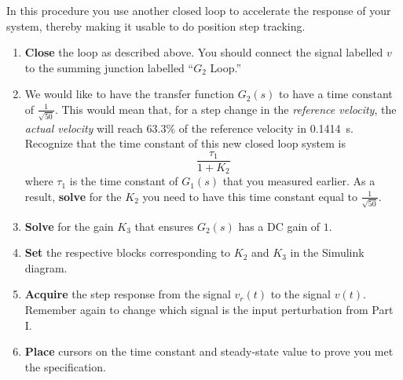 \begin{procedure}[label={proc:lab3:speedup}]
  In this procedure you use another closed loop to accelerate the response of your system, thereby making it usable to do position step tracking.
  \begin{enumerate}[label={(\arabic*)}]
    \item{%
      \textbf{Close} the loop as described above.
      You should connect the signal labelled \(v\) to the summing junction labelled ``\(G_2\) Loop.''%
    }
    \item{%
      We would like to have the transfer function \(G_2(s)\) to have a time constant of \(\frac{1}{\sqrt{50}}.\)
      This would mean that, for a step change in the \emph{reference velocity}, the \emph{actual velocity} will reach \(63.3\%\) of the reference velocity in \SI{0.1414}{s}.
      Recognize that the time constant of this new closed loop system is
      \[
        \frac{\tau_1}{1 + K_2}
      \]
      where \(\tau_1\) is the time constant of \(G_1(s)\) that you measured earlier.
      As a result, \textbf{solve} for the \(K_2\) you need to have this time constant equal to \(\frac{1}{\sqrt{50}}.\)%
    }
    \item{%
      \textbf{Solve} for the gain \(K_3\) that ensures \(G_2(s)\) has a DC gain of \(1.\)%
    }
    \item{%
      \textbf{Set} the respective blocks corresponding to \(K_2\) and \(K_3\) in the Simulink diagram.%
    }
    \item{%
      \textbf{Acquire} the step response from the signal \(v_r(t)\) to the signal \(v(t).\)
      Remember again to change which signal is the input perturbation from Part I.%
    }
    \item{%
      \textbf{Place} cursors on the time constant and steady-state value to prove you met the specification.%
    }
  \end{enumerate}
\end{procedure}

